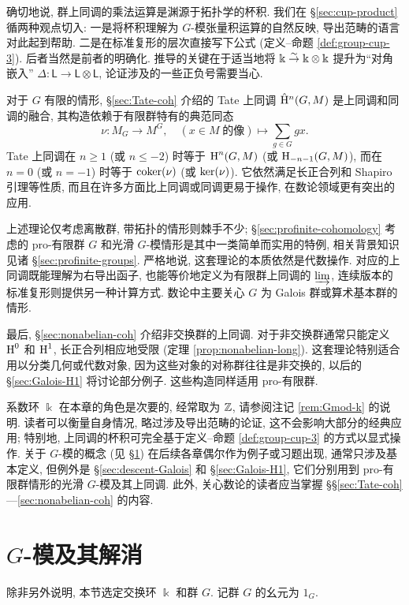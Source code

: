 确切地说, 群上同调的乘法运算是渊源于拓扑学的杯积. 我们在 \S\ref{sec:cup-product} 循两种观点切入: 一是将杯积理解为 $G$-模张量积运算的自然反映, 导出范畴的语言对此起到帮助. 二是在标准复形的层次直接写下公式 (定义--命题 \ref{def:group-cup-3}). 后者当然是前者的明确化. 推导的关键在于适当地将 $\Bbbk \stackrel{\sim}{\rightarrow} \Bbbk \otimes \Bbbk$ 提升为``对角嵌入'' $\Delta: \mathsf{L} \to \mathsf{L} \otimes \mathsf{L}$, 论证涉及的一些正负号需要当心.

对于 $G$ 有限的情形, \S\ref{sec:Tate-coh} 介绍的 Tate 上同调 $\hat{\mathrm{H}}^n(G, M)$ 是上同调和同调的融合, 其构造依赖于有限群特有的典范同态
\[ \nu: M_G \to M^G, \quad (x \in M \;\text{的像}) \mapsto \sum_{g \in G} gx. \]
Tate 上同调在 $n \geq 1$ (或 $n \leq -2$) 时等于 $\operatorname{H}^n(G, M)$ (或 $\operatorname{H}_{-n-1}(G, M)$), 而在 $n = 0$ (或 $n = -1$) 时等于 $\operatorname{coker}(\nu)$ (或 $\operatorname{ker}(\nu)$). 它依然满足长正合列和 Shapiro 引理等性质, 而且在许多方面比上同调或同调更易于操作, 在数论领域更有突出的应用.

上述理论仅考虑离散群, 带拓扑的情形则棘手不少; \S\ref{sec:profinite-cohomology} 考虑的 pro-有限群 $G$ 和光滑 $G$-模情形是其中一类简单而实用的特例, 相关背景知识见诸 \S\ref{sec:profinite-groups}. 严格地说, 这套理论的本质依然是代数操作. 对应的上同调既能理解为右导出函子, 也能等价地定义为有限群上同调的 $\varinjlim$, 连续版本的标准复形则提供另一种计算方式. 数论中主要关心 $G$ 为 Galois 群或算术基本群的情形.

最后, \S\ref{sec:nonabelian-coh} 介绍非交换群的上同调. 对于非交换群通常只能定义 $\operatorname{H}^0$ 和 $\operatorname{H}^1$, 长正合列相应地受限 (定理 \ref{prop:nonabelian-long}). 这套理论特别适合用以分类几何或代数对象, 因为这些对象的对称群往往是非交换的, 以后的 \S\ref{sec:Galois-H1} 将讨论部分例子. 这些构造同样适用 pro-有限群.

\begin{wenxintishi}
	系数环 $\Bbbk$ 在本章的角色是次要的, 经常取为 $\mathbb{Z}$, 请参阅注记 \ref{rem:Gmod-k} 的说明. 读者可以衡量自身情况, 略过涉及导出范畴的论证, 这不会影响大部分的经典应用; 特别地, 上同调的杯积可完全基于定义--命题 \ref{def:group-cup-3} 的方式以显式操作. 关于 $G$-模的概念 (见 \S\ref{sec:G-mod}) 在后续各章偶尔作为例子或习题出现, 通常只涉及基本定义, 但例外是 \S\ref{sec:descent-Galois} 和 \S\ref{sec:Galois-H1}, 它们分别用到 pro-有限群情形的光滑 $G$-模及其上同调. 此外, 关心数论的读者应当掌握 \S\S\ref{sec:Tate-coh}---\ref{sec:nonabelian-coh} 的内容.
\end{wenxintishi}

\section{\texorpdfstring{$G$}{G}-模及其解消}\label{sec:G-mod}
除非另外说明, 本节选定交换环 $\Bbbk$ 和群 $G$. 记群 $G$ 的幺元为 $1_G$.

